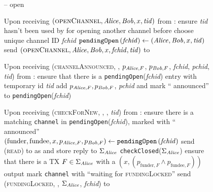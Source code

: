   \begin{figure}[H]
    \begin{systembox}{\fpaynet{} -- open}
      \begin{algorithmic}[1]
        \State Upon receiving $\left(\textsc{openChannel}, \mathit{Alice}, \mathit{Bob}, x,
        \mathit{tid}\right)$ from \alice:
        \Indent
          \State ensure \textit{tid} hasn't been used by \alice{} for opening
          another channel before
          \label{alg:fpaynet:open:valid}
          \State choose unique channel ID \textit{fchid}
          \State $\mathtt{pendingOpen}\left(\mathit{fchid}\right) \gets
          \left(\mathit{Alice}, \mathit{Bob}, x, \mathit{tid}\right)$
          \State send $\left(\textsc{openChannel}, \mathit{Alice}, \mathit{Bob}, x,
          \mathit{fchid}, \mathit{tid}\right)$ to \simulator
        \EndIndent
        \Statex

        \State Upon receiving (\textsc{channelAnnounced}, \alice, $p_{\mathit{Alice},
        F}$, $p_{\mathit{Bob}, F}$, \textit{fchid}, \textit{pchid}, \textit{tid}) from
        \simulator:
        \Indent
          \State ensure that there is a \texttt{pendingOpen}(\textit{fchid})
          entry with temporary id \textit{tid}
          \label{alg:fpaynet:announced:valid}
          \State add $p_{\mathit{Alice}, F}, p_{\mathit{Bob}, F}$, \textit{pchid} and  mark
          ``\alice{} announced'' to \texttt{pendingOpen}(\textit{fchid})
          \label{alg:fpaynet:announced:add}
        \EndIndent
        \Statex

        \State Upon receiving (\textsc{checkForNew}, \alice, \bob, \textit{tid})
        from \alice:
        \Indent
          \State ensure there is a matching \texttt{channel} in
          \texttt{pendingOpen}(\textit{fchid}), marked with ``\alice{}
          announced''
          \label{alg:fpaynet:checkForNew:valid}
          \State $\left(\mathrm{funder}, \mathrm{fundee}, x, p_{\mathit{Alice}, F},
          p_{\mathit{Bob}, F}\right) \gets
          \mathtt{pendingOpen}\left(\mathit{fchid}\right)$
          \State send (\textsc{read}) to \ledger{} as \alice{} and store reply
          to $\Sigma_{\mathit{Alice}}$
          \State \texttt{checkClosed}($\Sigma_{\mathit{Alice}}$)
          \label{alg:fpaynet:checkForNew:read:alice}
          \State ensure that there is a TX $F \in \Sigma_{\mathit{Alice}}$ with a
          $\left(x, \left(p_{\mathrm{funder}, F} \wedge p_{\mathrm{fundee},
          F}\right)\right)$ output
          \label{alg:fpaynet:checkForNew:included}
          \State mark \texttt{channel} with ``waiting for
          \textsc{fundingLocked}''
          \label{alg:fpaynet:checkForNew:mark}
          \State send (\textsc{fundingLocked}, \alice, $\Sigma_{\mathit{Alice}}$,
          \textit{fchid}) to \simulator
          \label{alg:fpaynet:checkForNew:sim}
        \EndIndent
        \Statex


\end{algorithmic}
\end{systembox}
\end{figure}
